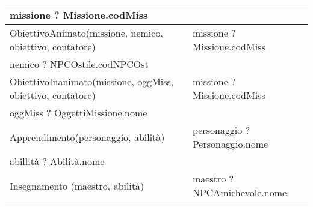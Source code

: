 \begin{table}[H]
{\begin{tabular}{|l|l|}
missione ? Missione.codMiss                                                                                                                                                                                                                &                                            \\ \hline
ObiettivoAnimato(missione, nemico,  obiettivo, contatore)                                                                                                                                                                                  & missione ? Missione.codMiss                \\ \hline
nemico ? NPCOstile.codNPCOst                                                                                                                                                                                                               &                                            \\ \hline
ObiettivoInanimato(missione, oggMiss, obiettivo, contatore)                                                                                                                                                                                & missione ? Missione.codMiss                \\ \hline
oggMiss ? OggettiMissione.nome                                                                                                                                                                                                             &                                            \\ \hline
Apprendimento(personaggio, abilità)                                                                                                                                                                                                        & personaggio ? Personaggio.nome             \\ \hline
abillità ? Abilità.nome                                                                                                                                                                                                                    &                                            \\ \hline
Insegnamento (maestro, abilità)                                                                                                                                                                                                            & maestro ? NPCAmichevole.nome               \\ \hline

\end{tabular}}
\end{table}
